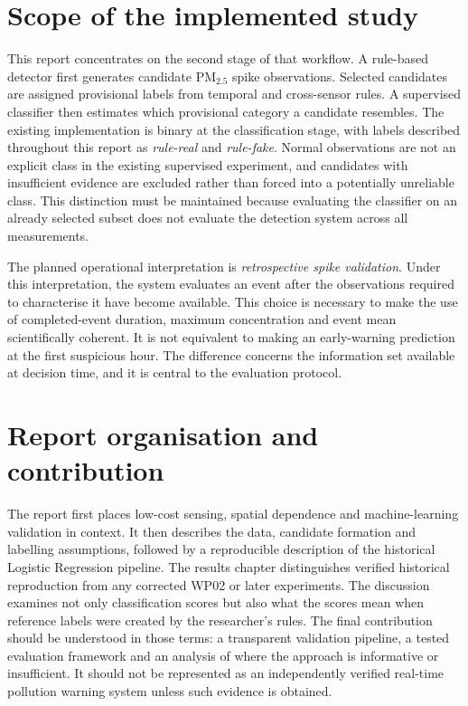 \documentclass[12pt,a4paper,oneside]{report}
\newcommand{\pmf}{PM$_{2.5}$}
\begin{document}
\section{Scope of the implemented study}
This report concentrates on the second stage of that workflow. A rule-based detector first generates candidate \pmf{} spike observations. Selected candidates are assigned provisional labels from temporal and cross-sensor rules. A supervised classifier then estimates which provisional category a candidate resembles. The existing implementation is binary at the classification stage, with labels described throughout this report as \emph{rule-real} and \emph{rule-fake}. Normal observations are not an explicit class in the existing supervised experiment, and candidates with insufficient evidence are excluded rather than forced into a potentially unreliable class. This distinction must be maintained because evaluating the classifier on an already selected subset does not evaluate the detection system across all measurements.

The planned operational interpretation is \emph{retrospective spike validation}. Under this interpretation, the system evaluates an event after the observations required to characterise it have become available. This choice is necessary to make the use of completed-event duration, maximum concentration and event mean scientifically coherent. It is not equivalent to making an early-warning prediction at the first suspicious hour. The difference concerns the information set available at decision time, and it is central to the evaluation protocol.

\section{Report organisation and contribution}
The report first places low-cost sensing, spatial dependence and machine-learning validation in context. It then describes the data, candidate formation and labelling assumptions, followed by a reproducible description of the historical Logistic Regression pipeline. The results chapter distinguishes verified historical reproduction from any corrected WP02 or later experiments. The discussion examines not only classification scores but also what the scores mean when reference labels were created by the researcher's rules. The final contribution should be understood in those terms: a transparent validation pipeline, a tested evaluation framework and an analysis of where the approach is informative or insufficient. It should not be represented as an independently verified real-time pollution warning system unless such evidence is obtained.
\end{document}

